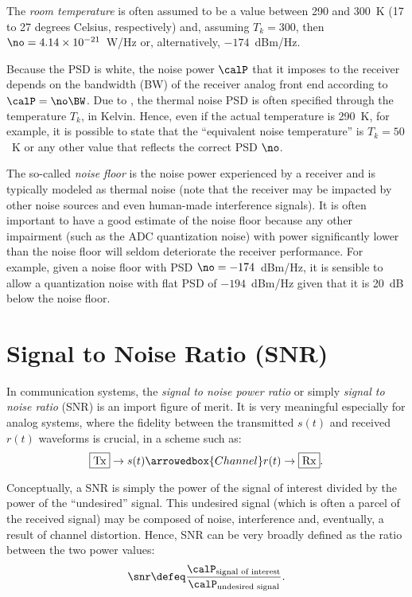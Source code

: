 The \emph{room temperature} is often assumed to be a value
between 290 and $300$~K (17 to 27 degrees Celsius, respectively) and, assuming $T_k=300$, 
then $\no = 4.14 \times 10^{-21}$~W/Hz or, alternatively, $-174$~dBm/Hz.

Because the PSD is white, the noise power $\calP$ that it imposes to the receiver depends on the bandwidth (BW) of the receiver analog front end according to $\calP=\no \BW$. Due to ,
the thermal noise PSD is often specified through the temperature $T_k$, in Kelvin.
Hence, even if the actual temperature is 290~K, for example, it is possible to state that 
the  ``equivalent noise temperature'' is $T_k=50$~K or any other value that reflects
the correct PSD $\no$.

The so-called \emph{noise floor}
is the noise power experienced by a receiver and is typically
modeled as thermal noise (note that the receiver may be impacted
by other noise sources and even human-made interference signals).
It is often important to have a good estimate of the noise
floor because any other impairment (such as
the ADC quantization noise) with power significantly lower than
the noise floor will seldom deteriorate the receiver performance.
For example, given a noise floor with PSD $\no=-174$~dBm/Hz, 
it is sensible to allow a quantization noise with flat PSD 
of $-194$~dBm/Hz given that it is 20~dB below the noise floor.

\section{Signal to Noise Ratio (SNR)}

In communication systems, the \emph{signal to noise power ratio} or simply \emph{signal to noise ratio} (SNR) is an import figure of merit. It is very meaningful especially for analog systems, where the fidelity between the transmitted $s(t)$ and received $r(t)$ waveforms is crucial, in a scheme such as:
\[
\fbox{Tx} \rightarrow  s(t) \arrowedbox{Channel} r(t) \rightarrow  \fbox{Rx}.
\]

Conceptually, a SNR is simply the power of the signal of interest divided by the power of the ``undesired'' signal.
This undesired signal (which is often a parcel of the received signal) may be composed of noise, interference and, eventually, a result of channel distortion. Hence, SNR can be very broadly defined as the ratio between the two power values:
\begin{equation}
\snr \defeq \frac{\calP_{\textrm{signal of interest}}}{\calP_{\textrm{undesired signal}}}.
\label{eq:snr_simple}
\end{equation}


